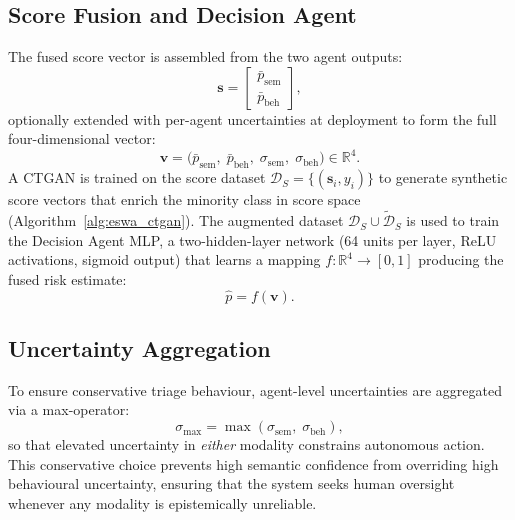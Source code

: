 \subsection{Score Fusion and Decision Agent}

The fused score vector is assembled from the two agent outputs:
\begin{equation}
\mathbf{s} = \begin{bmatrix} \bar{p}_\text{sem} \\ \bar{p}_\text{beh} \end{bmatrix},
\label{eq:eswa_scorevec}
\end{equation}
optionally extended with per-agent uncertainties at deployment to form the full four-dimensional vector:
\begin{equation}
\mathbf{v} = \bigl(\bar{p}_\text{sem},\; \bar{p}_\text{beh},\; \sigma_\text{sem},\; \sigma_\text{beh}\bigr) \in \mathbb{R}^4.
\label{eq:eswa_fullvec}
\end{equation}
A CTGAN \cite{xu2019ctgan} is trained on the score dataset $\mathcal{D}_S = \{(\mathbf{s}_i, y_i)\}$ to generate synthetic score vectors that enrich the minority class in score space (Algorithm~\ref{alg:eswa_ctgan}). The augmented dataset $\mathcal{D}_S \cup \tilde{\mathcal{D}}_S$ is used to train the Decision Agent MLP, a two-hidden-layer network (64 units per layer, ReLU activations, sigmoid output) that learns a mapping $f: \mathbb{R}^4 \to [0,1]$ producing the fused risk estimate:
\begin{equation}
\hat{p} = f(\mathbf{v}).
\label{eq:eswa_fusedp}
\end{equation}

\subsection{Uncertainty Aggregation}

To ensure conservative triage behaviour, agent-level uncertainties are aggregated via a max-operator:
\begin{equation}
\sigma_\text{max} = \max(\sigma_\text{sem},\; \sigma_\text{beh}),
\label{eq:eswa_sigmamax}
\end{equation}
so that elevated uncertainty in \emph{either} modality constrains autonomous action. This conservative choice prevents high semantic confidence from overriding high behavioural uncertainty, ensuring that the system seeks human oversight whenever any modality is epistemically unreliable.

